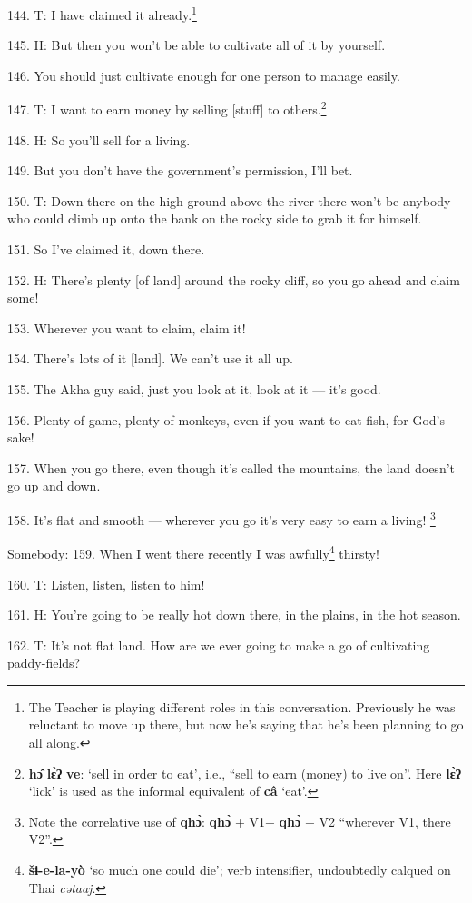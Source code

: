 144. T: I have claimed it already.\footnote{The Teacher is playing different roles in this conversation. Previously he was reluctant to move up there, but now he's saying that he's been planning to go all along.}

145. H: But then you won't be able to cultivate all of it by yourself.

146. You should just cultivate enough for one person to manage easily.

147. T: I want to earn money by selling [stuff] to others.\footnote{\textbf{hɔ̂} \textbf{lɛ̀ʔ} \textbf{ve}: `sell in order to eat', i.e., ``sell to earn (money) to live on''. Here \textbf{lɛ̀ʔ} `lick' is used as the informal equivalent of \textbf{câ} `eat'.}

148. H: So you'll sell for a living.

149. But you don't have the government's permission, I'll bet.

150. T: Down there on the high ground above the river there won't be anybody who
could climb up onto the bank on the rocky side to grab it for himself.

151. So I've claimed it, down there.

152. H: There's plenty [of land] around the rocky cliff, so you go ahead and claim
some!

153. Wherever you want to claim, claim it!

154. There's lots of it [land]. We can't use it all up.

155. The Akha guy said, just you look at it, look at it --- it's good.

156. Plenty of game, plenty of monkeys, even if you want to eat fish, for God's
sake!

157. When you go there, even though it's called the mountains, the land doesn't
go up and down.

158. It's flat and smooth --- wherever you go it's very easy to earn a living!
\footnote{Note the correlative use of \textbf{qhɔ̀}: \textbf{qhɔ̀} + V1+ \textbf{qhɔ̀} + V2 ``wherever V1, there V2''.}

Somebody: 159. When I went there recently I was awfully\footnote{\textbf{šɨ-e-la-yò} `so much one could die'; verb intensifier, undoubtedly calqued on Thai \textit{cətaaj}.} thirsty!

160. T: Listen, listen, listen to him!

161. H: You're going to be really hot down there, in the plains, in the hot season.

162. T: It's not flat land. How are we ever going to make a go of cultivating paddy-fields?

